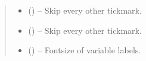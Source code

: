 \documentclass[letterpaper,10pt,english]{sphinxmanual}
\begin{document}
\begin{fulllineitems}
\begin{quote}
\begin{description}
\begin{itemize}
\item {} 
 (\sphinxstyleliteralemphasis{, }\sphinxstyleliteralemphasis{ (}\sphinxstyleliteralemphasis{)}\sphinxstyleliteralemphasis{}) -- Skip every other tickmark.

\item {} 
 (\sphinxstyleliteralemphasis{, }\sphinxstyleliteralemphasis{ (}\sphinxstyleliteralemphasis{)}\sphinxstyleliteralemphasis{}) -- Skip every other tickmark.

\item {} 
 (\sphinxstyleliteralemphasis{, }\sphinxstyleliteralemphasis{ (}\sphinxstyleliteralemphasis{)}\sphinxstyleliteralemphasis{}) -- Fontsize of variable labels.

\end{itemize}

\end{description}\end{quote}

\end{fulllineitems}

\end{document}
